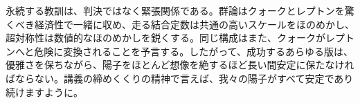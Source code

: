 
永続する教訓は、判決ではなく緊張関係である。群論はクォークとレプトンを驚くべき経済性で一緒に収め、走る結合定数は共通の高いスケールをほのめかし、超対称性は数値的なほのめかしを鋭くする。同じ構成はまた、クォークがレプトンへと危険に変換されることを予言する。したがって、成功するあらゆる版は、優雅さを保ちながら、陽子をほとんど想像を絶するほど長い間安定に保たなければならない。講義の締めくくりの精神で言えば、我々の陽子がすべて安定であり続けますように。
